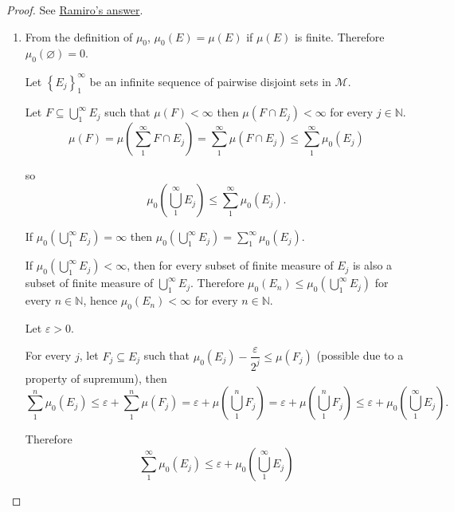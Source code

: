 \begin{proof}
    See \href{https://math.stackexchange.com/questions/1788830/real-analysis-folland-problem-1-3-15-measures}{Ramiro's answer}.

    \begin{enumerate}[itemsep=0pt,label=\textbf{\alph*.}]
        \item From the definition of \( \mu_{0} \), \( \mu_{0}(E) = \mu(E) \) if \( \mu(E) \) is finite. Therefore \( \mu_{0}(\varnothing) = 0 \).

              Let \( {\left\{ E_{j} \right\}}_{1}^{\infty} \) be an infinite sequence of pairwise disjoint sets in \( \mathcal{M} \).

              Let \( F \subseteq \bigcup_{1}^{\infty} E_{j} \) such that \( \mu(F) < \infty \) then \( \mu(F \cap E_{j}) < \infty \) for every \( j \in \mathbb{N} \).
              \[
                  \mu(F) = \mu\left(\sum_{1}^{\infty} F \cap E_{j} \right) = \sum_{1}^{\infty} \mu(F \cap E_{j}) \le \sum_{1}^{\infty} \mu_{0}(E_{j})
              \]

              so
              \[
                  \mu_{0}\left( \bigcup_{1}^{\infty} E_{j} \right) \le \sum_{1}^{\infty} \mu_{0}(E_{j}).
              \]

              If \( \mu_{0}\left( \bigcup_{1}^{\infty} E_{j} \right) = \infty \)  then \( \mu_{0}\left( \bigcup_{1}^{\infty} E_{j} \right) = \sum_{1}^{\infty} \mu_{0}(E_{j}) \).

              If \( \mu_{0}\left( \bigcup_{1}^{\infty} E_{j} \right) < \infty \), then for every subset of finite measure of \( E_{j} \) is also a subset of finite measure of \( \bigcup_{1}^{\infty} E_{j} \). Therefore \( \mu_{0}(E_{n}) \le \mu_{0}\left( \bigcup_{1}^{\infty} E_{j} \right) \) for every \( n \in \mathbb{N} \), hence \( \mu_{0}(E_{n}) < \infty \) for every \( n \in \mathbb{N} \).

              Let \( \varepsilon > 0 \).

              For every \( j \), let \( F_{j} \subseteq E_{j} \) such that \( \mu_{0}(E_{j}) - \dfrac{\varepsilon}{2^{j}} \le \mu(F_{j}) \) (possible due to a property of supremum), then
              \[
                  \sum_{1}^{n} \mu_{0}(E_{j}) \le \varepsilon + \sum_{1}^{n} \mu(F_{j}) = \varepsilon + \mu\left(\bigcup_{1}^{n} F_{j}\right) = \varepsilon + \mu\left(\bigcup_{1}^{n} F_{j}\right) \le \varepsilon + \mu_{0}\left(\bigcup_{1}^{\infty} E_{j}\right).
              \]

              Therefore
              \[
                  \sum_{1}^{\infty} \mu_{0}(E_{j}) \le \varepsilon + \mu_{0}\left(\bigcup_{1}^{\infty} E_{j}\right)
              \]


\end{enumerate}
\end{proof}
